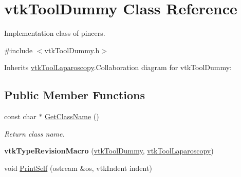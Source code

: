 \hypertarget{classvtkToolDummy}{
\section{vtkToolDummy Class Reference}
\label{classvtkToolDummy}
}


Implementation class of pincers.  


{\ttfamily \#include $<$vtkToolDummy.h$>$}

Inherits \hyperlink{classvtkToolLaparoscopy}{vtkToolLaparoscopy}.Collaboration diagram for vtkToolDummy:\subsection*{Public Member Functions}
\begin{DoxyCompactItemize}
\item 
\hypertarget{classvtkToolDummy_a7e647f03fad14d87b9f9ee9fb793d664}{
const char $\ast$ \hyperlink{classvtkToolDummy_a7e647f03fad14d87b9f9ee9fb793d664}{GetClassName} ()}
\label{classvtkToolDummy_a7e647f03fad14d87b9f9ee9fb793d664}

\begin{DoxyCompactList}\small\item\em Return class name. \item\end{DoxyCompactList}\item 
\hypertarget{classvtkToolDummy_acaaa2e036bc347ffae575d818fbc943f}{
{\bfseries vtkTypeRevisionMacro} (\hyperlink{classvtkToolDummy}{vtkToolDummy}, \hyperlink{classvtkToolLaparoscopy}{vtkToolLaparoscopy})}
\label{classvtkToolDummy_acaaa2e036bc347ffae575d818fbc943f}

\item 
\hypertarget{classvtkToolDummy_abfdf88480ec5e4abd7046b36549cc0f6}{
void \hyperlink{classvtkToolDummy_abfdf88480ec5e4abd7046b36549cc0f6}{PrintSelf} (ostream \&os, vtkIndent indent)}
\label{classvtkToolDummy_abfdf88480ec5e4abd7046b36549cc0f6}


\end{DoxyCompactItemize}
